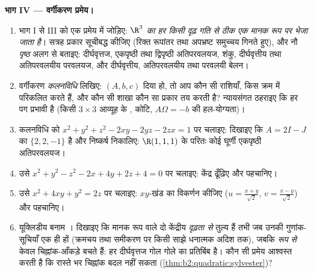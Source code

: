\begin{problem}[{सप्ताहांत समस्या --- हर द्विघातज पृष्ठ,
वर्णक्रमीय प्रमेय से छाँटा हुआ}]
\medskip
\noindent\textbf{भाग IV --- वर्गीकरण प्रमेय।}
\begin{enumerate}[resume]
  \item भाग I से III को एक प्रमेय में जोड़िए: \emph{$\R^3$ का हर
         किसी दृढ़ गति से ठीक एक मानक रूप पर भेजा जाता
        है}। सत्रह  प्रकार सूचीबद्ध कीजिए (रिक्त रूपांतर
        तथा अपभ्रष्ट समुच्चय गिनते हुए), और नौ 
        \emph{पृष्ठ} अलग से बताइए: दीर्घवृत्तज, एकपृष्ठी तथा
        द्विपृष्ठी अतिपरवलयज, शंकु, दीर्घवृत्तीय तथा
        अतिपरवलयीय परवलयज, और दीर्घवृत्तीय, अतिपरवलयीय तथा
        परवलयी बेलन।
  \item वर्गीकरण \emph{कलनविधि} लिखिए: $(A,
        b, c)$ दिया हो, तो आप कौन
        सी राशियाँ, किस क्रम में परिकलित करते हैं, और कौन सी
        शाखा कौन सा प्रकार तय करती है? न्यायसंगत ठहराइए कि हर
        पग प्रभावी है (किसी  $3\times3$ आव्यूह के , कोटि, $A\Omega = -b$ की हल-योग्यता)।
  \item कलनविधि को $x^2 + y^2 + z^2 - 2xy - 2yz -
        2zx = 1$ पर चलाइए: दिखाइए कि $A = 2I - J$ का 
        $\{2, 2,
        -1\}$ है और निष्कर्ष निकालिए: $\R(1,1,1)$ के परितः कोई घूर्णी
        एकपृष्ठी अतिपरवलयज।
  \item उसे $x^2 + y^2 - z^2 - 2x + 4y + 2z + 4 = 0$ पर चलाइए: केंद्र ढूँढ़िए और  पहचानिए।
  \item उसे $x^2 + 4xy + y^2 = 2z$ पर चलाइए: $xy$-खंड का विकर्णन कीजिए ($u = \frac{x+y}{\sqrt2}$,
        $v =
        \frac{x-y}{\sqrt2}$) और  पहचानिए।
  \item यूक्लिडीय बनाम । दिखाइए कि मानक रूप वाले दो
        केंद्रीय  \emph{दृढ़ता से} तुल्य हैं तभी जब
        उनकी गुणांक-सूचियाँ एक ही हों (क्रमचय तथा समीकरण पर
        किसी साझे धनात्मक अदिश तक), जबकि \emph{ रूप से}
        केवल चिह्नांक-आँकड़े बचते हैं: हर दीर्घवृत्तज गोल गोले
        का  प्रतिबिंब है। कौन सी प्रमेय आश्वस्त करती है कि
        रास्ते भर चिह्नांक बदल नहीं सकता (\cref{thm:b2:quadratic:sylvester})?
\end{enumerate}


\end{problem}
